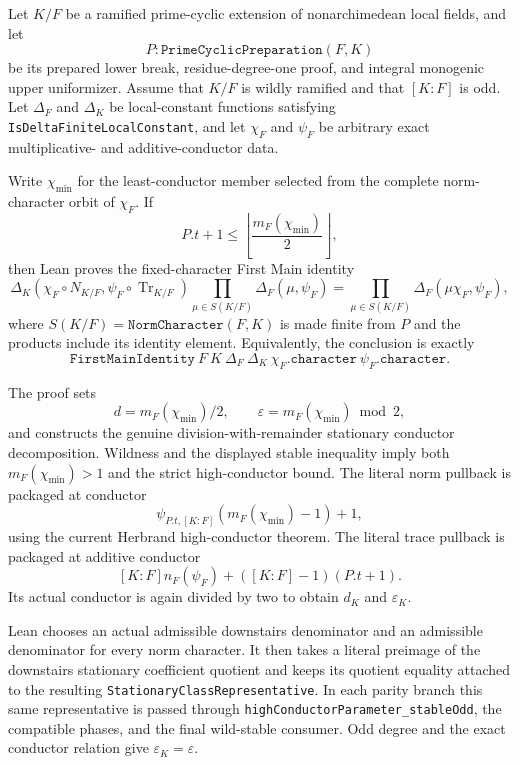\begin{theorem}
\label{mod:cases-wildstablepreparation}
Let $K/F$ be a ramified prime-cyclic extension of nonarchimedean local
fields, and let
\[
 P:\texttt{PrimeCyclicPreparation}(F,K)
\]
be its prepared lower break, residue-degree-one proof, and integral
monogenic upper uniformizer.  Assume that $K/F$ is wildly ramified and that
$[K:F]$ is odd.  Let $\Delta_F$ and $\Delta_K$ be local-constant functions
satisfying \texttt{IsDeltaFiniteLocalConstant}, and let $\chi_F$ and
$\psi_F$ be arbitrary exact multiplicative- and additive-conductor data.

Write $\chi_{\min}$ for the least-conductor member selected from the complete
norm-character orbit of $\chi_F$.  If
\[
  P.t+1\le
  \left\lfloor\frac{m_F(\chi_{\min})}{2}\right\rfloor,
\]
then Lean proves the fixed-character First Main identity
\[
 \Delta_K(\chi_F\circ N_{K/F},
          \psi_F\circ\operatorname{Tr}_{K/F})
 \prod_{\mu\in S(K/F)}\Delta_F(\mu,\psi_F)
 =
 \prod_{\mu\in S(K/F)}\Delta_F(\mu\chi_F,\psi_F),
\]
where $S(K/F)=\texttt{NormCharacter}(F,K)$ is made finite from $P$ and the
products include its identity element.  Equivalently, the conclusion is
exactly
\[
 \texttt{FirstMainIdentity}\ F\ K\ \Delta_F\ \Delta_K\
   \chi_F.\texttt{character}\ \psi_F.\texttt{character}.
\]

The proof sets
\[
 d=m_F(\chi_{\min})/2,
 \qquad \varepsilon=m_F(\chi_{\min})\bmod 2,
\]
and constructs the genuine division-with-remainder stationary conductor
decomposition.  Wildness and the displayed stable inequality imply both
$m_F(\chi_{\min})>1$ and the strict high-conductor bound.  The literal norm
pullback is packaged at conductor
\[
 \psi_{P.t,[K:F]}(m_F(\chi_{\min})-1)+1,
\]
using the current Herbrand high-conductor theorem.  The literal trace
pullback is packaged at additive conductor
\[
 [K:F]n_F(\psi_F)+([K:F]-1)(P.t+1).
\]
Its actual conductor is again divided by two to obtain $d_K$ and
$\varepsilon_K$.

Lean chooses an actual admissible downstairs denominator and an admissible
denominator for every norm character.  It then takes a literal preimage of
the downstairs stationary coefficient quotient and keeps its quotient
equality attached to the resulting
\texttt{StationaryClassRepresentative}.  In each parity branch this same
representative is passed through \texttt{highConductorParameter\_stableOdd},
the compatible phases, and the final wild-stable consumer.  Odd degree and
the exact conductor relation give
$\varepsilon_K=\varepsilon$.


\end{theorem}
